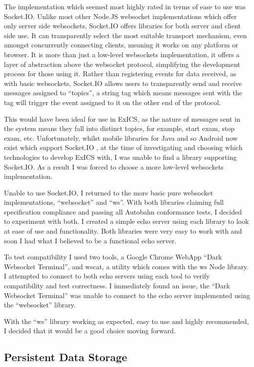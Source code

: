 The implementation which seemed most highly rated in terms of ease to use was Socket.IO.  Unlike most other Node.JS websocket implementations which offer only server side websockets, Socket.IO offers libraries for both server and client side use.  It can transparently select the most suitable transport mechanism, even amongst concurrently connecting clients, meaning it works on any platform or browser.  It is more than just a low-level websockets implementation, it offers a layer of abstraction above the websocket protocol, simplifying the development process for those using it.  Rather than registering events for data received, as with basic websockets, Socket.IO allows users to transparently send and receive messages assigned to ``topics'', a string tag which means messages sent with the tag will trigger the event assigned to it on the other end of the protocol.

This would have been ideal for use in ExICS, as the nature of messages sent in the system means they fall into distinct topics, for example, start exam, stop exam, etc.  Unfortunately, whilst mobile libraries for Java and so Android now exist which support Socket.IO \cite{AndroidAsync}, at the time of investigating and choosing which technologies to develop ExICS with, I was unable to find a library supporting Socket.IO.  As a result I was forced to choose a more low-level websockets implementation.

Unable to use Socket.IO, I returned to the more basic pure websocket implementations, ``websocket'' and ``ws''.  With both libraries claiming full specification compliance and passing all Autobahn conformance tests, I decided to experiment with both.  I created a simple echo server using each library to look at ease of use and functionality.  Both libraries were very easy to work with and soon I had what I believed to be a functional echo server.

To test compatibility I used two tools, a Google Chrome WebApp ``Dark Websocket Terminal''\cite{dwst}, and wscat, a utility which comes with the ws Node library.  I attempted to connect to both echo servers using each tool to verify compatibility and test correctness.  I immediately found an issue, the ``Dark Websocket Terminal'' was unable to connect to the echo server implemented using the ``websocket'' library.

With the ``ws'' library working as expected, easy to use and highly recommended, I decided that it would be a good choice moving forward.

\subsection{Persistent Data Storage}

